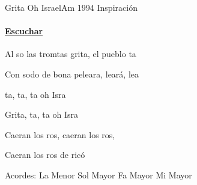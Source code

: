 \documentclass[12pt, spanish]{book}
\newcommand{\NotCCLIed}{\relax}
\begin{document}
    \begin{song}{Grita Oh Israel}{Am}
        {1994} %
        {Inspiración}
        {} %
        {} %
        \ifChordBk
        \paragraph{\mbox{}\hfill\protect\href{https://open.spotify.com/intl-es/track/4Ni1lXTgMG7iARywlIWwzi}{Escuchar}\mbox{}\hfill}
        \fi

        \begin{SBOpGroup}
            Al so las tromtas grita, el pueblo ta

            Con sodo de bona peleara, leará, lea
        \end{SBOpGroup}

        \begin{SBOpGroup}
            ta, ta, ta oh Isra

            Grita, ta, ta oh Isra
        \end{SBOpGroup}

        \begin{SBChorus}
            Caeran los ros, caeran los ros,

            Caeran los ros de ricó 
        \end{SBChorus}

        \ifChordBk
        \begin{SBOpGroup}
            Acordes:\break
            \upchord{\Am}\qquad La Menor \hfill
            \upchord{\G}\qquad Sol Mayor \hfill\null\break
            \upchord{\F}\qquad Fa Mayor \hfill
            \upchord{\E}\qquad Mi Mayor \hfill\null\break
        \end{SBOpGroup}
        \fi
    \end{song}
\end{document}

